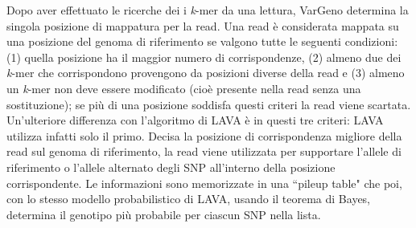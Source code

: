 \documentclass[../main.tex]{subfiles}
\begin{document}
\noindent
Dopo aver effettuato le ricerche dei i \textit{k}-mer da una lettura, VarGeno determina la singola posizione di mappatura per la read. Una read è considerata mappata su una posizione del genoma di riferimento se valgono tutte le seguenti condizioni: (1) quella posizione ha il maggior numero di corrispondenze, (2) almeno due dei \textit{k}-mer che corrispondono provengono da posizioni diverse della read e (3) almeno un \textit{k}-mer non deve essere modificato (cioè presente nella read senza una sostituzione); se più di una posizione soddisfa questi criteri la read viene scartata. Un'ulteriore differenza con l'algoritmo di LAVA è in questi tre criteri: LAVA utilizza infatti solo il primo. Decisa la posizione di corrispondenza migliore della read sul genoma di riferimento, la read viene utilizzata per supportare l'allele di riferimento o l'allele alternato degli SNP all'interno della posizione corrispondente. Le informazioni sono memorizzate in una ``pileup table" che poi, con lo stesso modello probabilistico di LAVA, usando il teorema di Bayes, determina il genotipo più probabile per ciascun SNP nella lista.
\end{document}
